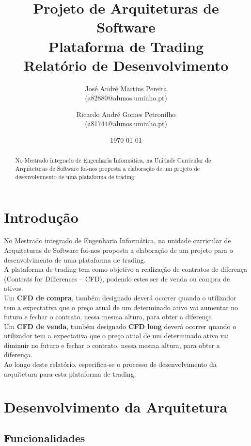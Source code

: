 \documentclass[11pt,a4paper]{report}%
\title{Projeto de Arquiteturas de Software\\
       \textbf{Plataforma de Trading}\\ Relatório de Desenvolvimento
       } %
\author{José André Martins Pereira\\ (a82880@alunos.uminho.pt) \and Ricardo André Gomes Petronilho\\ (a81744@alunos.uminho.pt)
       } %
\date{\today} %
\begin{document}
\maketitle %

\begin{abstract}  %
No Mestrado integrado de Engenharia Informática, na Unidade Curricular de Arquiteturas de Software foi-nos proposta a elaboração de um projeto de desenvolvimento de uma plataforma de trading.
\end{abstract}

\tableofcontents %

\chapter{Introdução} \label{chap:intro} %

No Mestrado integrado de Engenharia Informática, na unidade curricular de Arquiteturas de Software foi-nos proposta a elaboração de um projeto para o desenvolvimento de uma plataforma de trading.\\
A plataforma de trading tem como objetivo a realização de contratos de diferença (Contrats for Differences – CFD), podendo estes ser de venda ou compra de ativos.\\
Um \textbf{CFD de compra}, também designado  deverá ocorrer quando o utilizador tem a expectativa que o preço atual de um determinado ativo vai aumentar no futuro e  fechar o contrato, nessa mesma altura, para obter a diferença.\\
Um \textbf{CFD de venda}, também designado \textbf{CFD long} deverá ocorrer quando o utilizador tem a expectativa que o preço atual de um determinado ativo vai diminuir no futuro e  fechar o contrato, nessa mesma altura, para obter a diferença.\\
Ao longo deste relatório, especifica-se o processo de desenvolvimento da arquitetura para esta plataforma de trading.


\chapter{Desenvolvimento da Arquitetura}

\section{Funcionalidades}
\end{document}
